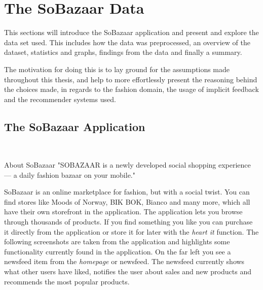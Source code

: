 
\chapter{The SoBazaar Data}
\label{chap:thesobazaardata}
\minitoc

    This sections will introduce the SoBazaar application and present and explore the data set used.
    This includes how the data was preprocessed, an overview of the dataset, statistics and graphs, findings from the data and finally a summary.

    The motivation for doing this is to lay ground for the assumptions made throughout this thesis, and help to more effortlessly present the reasoning behind the choices made, in regards to the fashion domain, the usage of implicit feedback and the recommender systems used.

\clearpage
	\section{The SoBazaar Application}\mbox{}\\
  \label{sec:sobazaar-data}

	\begin{chapquote}[30pt]{About SoBazaar}
	  "SOBAZAAR is a newly developed social shopping experience --- a daily fashion bazaar on your mobile."
	\end{chapquote}

	SoBazaar is an online marketplace for fashion, but with a social twist. You can find stores like Moods of Norway, BIK BOK, Bianco and many more, which all have their own storefront in the application. The application lets you browse through thousands of products. If you find something you like you can purchase it directly from the application or store it for later with the \emph{heart it} function. The following screenshots are taken from the application and highlights some functionality currently found in the application. On the far left you see a newsfeed item from the \emph{homepage} or newsfeed. The newsfeed currently shows what other users have liked, notifies the user about sales and new products and recommends the most popular products.

